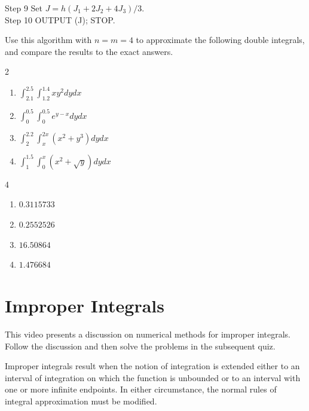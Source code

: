 \begin{myexercise}
\begin{boxB}

Step 9 Set $J=h\left(J_{1}+2 J_{2}+4 J_{3}\right) / 3$.\\
Step 10 OUTPUT (J); STOP.
\end{boxB}
Use this algorithm with $n=m=4$ to approximate the following double integrals, and compare the results to the exact answers.
\begin{multicols}{2}
\begin{enumerate}[label=(\alph*)]
\item $\int_{2.1}^{2.5} \int_{1.2}^{1.4} x y^{2} d y d x$\\
\item $\int_{0}^{0.5} \int_{0}^{0.5} e^{y-x} d y d x$
\item $\int_{2}^{2.2} \int_{x}^{2 x}\left(x^{2}+y^{3}\right) d y d x$\\
\item $\int_{1}^{1.5} \int_{0}^{x}\left(x^{2}+\sqrt{y}\right) d y d x$
 \end{enumerate}
\end{multicols}
\end{myexercise}

\begin{mysolution}
\begin{multicols}{4}
\begin{enumerate}[label=(\alph*)]
\item $0.3115733$
\item $0.2552526$
\item $16.50864$
\item $1.476684$
 \end{enumerate}
\end{multicols}
\end{mysolution}

\section{Improper Integrals}
\videolesson
\begin{selfvideo}[2]
This video presents a discussion on numerical methods for improper integrals. Follow the discussion and then solve the problems in the subsequent quiz.
\end{selfvideo}

Improper integrals result when the notion of integration is extended either to an interval of integration on which the function is unbounded or to an interval with one or more infinite endpoints. In either circumstance, the normal rules of integral approximation must be modified.

